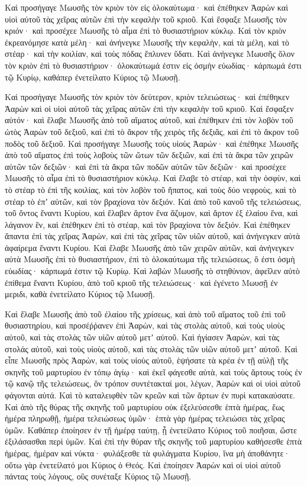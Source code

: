 {Καὶ προσήγαγε Μωυσῆς τὸν κριὸν τὸν εἰς ὁλοκαύτωμα· καὶ ἐπέθηκεν Ἀαρὼν καὶ υἱοὶ αὐτοῦ τὰς χεῖρας αὐτῶν ἐπὶ τὴν κεφαλὴν τοῦ κριοῦ. Καὶ ἔσφαξε Μωυσῆς τὸν κριόν· καὶ προσέχεε Μωυσῆς τὸ αἷμα ἐπὶ τὸ θυσιαστήριον κύκλῳ.
Καὶ τὸν κριὸν ἐκρεανόμησε κατὰ μέλη· καὶ ἀνήνεγκε Μωυσῆς τὴν κεφαλὴν, καὶ τὰ μέλη, καὶ τὸ στέαρ· καὶ τὴν κοιλίαν, καὶ τοὺς πόδας ἔπλυνεν ὕδατι.
Καὶ ἀνήνεγκε Μωυσῆς ὅλον τὸν κριὸν ἐπὶ τὸ θυσιαστήριον· ὁλοκαύτωμά ἐστιν εἰς ὀσμὴν εὐωδίας· κάρπωμά ἐστι τῷ Κυρίῳ, καθάπερ ἐνετείλατο Κύριος τῷ Μωυσῇ.
\par }{\PP {}Καὶ προσήγαγε Μωυσῆς τὸν κριὸν τὸν δεύτερον, κριὸν τελειώσεως· καὶ ἐπέθηκεν Ἀαρὼν καὶ οἱ υἱοὶ αὐτοῦ τὰς χεῖρας αὐτῶν ἐπὶ τὴν κεφαλὴν τοῦ κριοῦ.
Καὶ ἔσφαξεν αὐτόν· καὶ ἔλαβε Μωυσῆς ἀπὸ τοῦ αἵματος αὐτοῦ, καὶ ἐπέθηκεν ἐπὶ τὸν λοβὸν τοῦ ὠτὸς Ἀαρὼν τοῦ δεξιοῦ, καὶ ἐπὶ τὸ ἄκρον τῆς χειρὸς τῆς δεξιᾶς, καὶ ἐπὶ τὸ ἄκρον τοῦ ποδὸς τοῦ δεξιοῦ.
Καὶ προσήγαγε Μωυσῆς τοὺς υἱοὺς Ἀαρών· καὶ ἐπέθηκε Μωυσῆς ἀπὸ τοῦ αἵματος ἐπὶ τοὺς λοβοὺς τῶν ὤτων τῶν δεξιῶν, καὶ ἐπὶ τὰ ἄκρα τῶν χειρῶν αὐτῶν τῶν δεξιῶν· καὶ ἐπὶ τὰ ἄκρα τῶν ποδῶν αὐτῶν τῶν δεξιῶν· καὶ προσέχεε Μωυσῆς τὸ αἷμα ἐπὶ τὸ θυσιαστήριον κύκλῳ.
Καὶ ἔλαβε τὸ στέαρ, καὶ τὴν ὀσφὺν, καὶ τὸ στέαρ τὸ ἐπὶ τῆς κοιλίας, καὶ τὸν λοβὸν τοῦ ἥπατος, καὶ τοὺς δύο νεφροὺς, καὶ τὸ στέαρ τὸ ἐπʼ αὐτῶν, καὶ τὸν βραχίονα τὸν δεξιόν.
Καὶ ἀπὸ τοῦ κανοῦ τῆς τελειώσεως, τοῦ ὄντος ἔναντι Κυρίου, καὶ ἔλαβεν ἄρτον ἕνα ἄζυμον, καὶ ἄρτον ἐξ ἐλαίου ἕνα, καὶ λάγανον ἓν, καὶ ἐπέθηκεν ἐπὶ τὸ στέαρ, καὶ τὸν βραχίονα τὸν δεξιόν.
Καὶ ἐπέθηκεν ἅπαντα ἐπὶ τὰς χεῖρας Ἀαρὼν, καὶ ἐπὶ τὰς χεῖρας τῶν υἱῶν αὐτοῦ, καὶ ἀνήνεγκεν αὐτὰ ἀφαίρεμα ἔναντι Κυρίου.
Καὶ ἔλαβε Μωυσῆς ἀπὸ τῶν χειρῶν αὐτῶν, καὶ ἀνήνεγκεν αὐτὰ Μωυσῆς ἐπὶ τὸ θυσιαστήριον, ἐπὶ τὸ ὁλοκαύτωμα τῆς τελειώσεως, ὅ ἐστι ὀσμὴ εὐωδίας· κάρπωμά ἐστιν τῷ Κυρίῳ.
Καὶ λαβὼν Μωυσῆς τὸ στηθύνιον, ἀφεῖλεν αὐτὸ ἐπίθεμα ἔναντι Κυρίου, ἀπὸ τοῦ κριοῦ τῆς τελειώσεως· καὶ ἐγένετο Μωυσῇ ἐν μεριδι, καθὰ ἐνετείλατο Κύριος τῷ Μωυσῇ.
\par }{\PP {}Καὶ ἔλαβε Μωυσῆς ἀπὸ τοῦ ἐλαίου τῆς χρίσεως, καὶ ἀπὸ τοῦ αἵματος τοῦ ἐπὶ τοῦ θυσιαστηρίου, καὶ προσέῤῥανεν ἐπὶ Ἀαρὼν, καὶ τὰς στολὰς αὐτοῦ, καὶ τοὺς υἱοὺς αὐτοῦ, καὶ τὰς στολὰς τῶν υἱῶν αὐτοῦ μετʼ αὐτοῦ.
Καὶ ἡγίασεν Ἀαρὼν, καὶ τὰς στολάς αὐτοῦ, καὶ τοὺς υἱοὺς αὐτοῦ, καὶ τὰς στολὰς τῶν υἱῶν αὐτοῦ μετʼ αὐτοῦ.
Καὶ εἶπε Μωυσῆς πρὸς Ἀαρὼν, καὶ τοὺς υἱοὺς αὐτοῦ, ἑψήσατε τὰ κρέα ἐν τῇ αὐλῇ τῆς σκηνῆς τοῦ μαρτυρίου ἐν τόπῳ ἁγίῳ· καὶ ἐκεῖ φάγεσθε αὐτὰ, καὶ τοὺς ἄρτους τοὺς ἐν τῷ κανῷ τῆς τελειώσεως, ὃν τρόπον συντέτακταί μοι, λέγων, Ἀαρὼν καὶ οἱ υἱοὶ αὐτοῦ φάγονται αὐτά.
Καὶ τὸ καταλειφθὲν τῶν κρεῶν καὶ τῶν ἄρτων ἐν πυρὶ κατακαύσατε.
Καὶ ἀπὸ τῆς θύρας τῆς σκηνῆς τοῦ μαρτυρίου οὐκ ἐξελεύσεσθε ἑπτὰ ἡμέρας, ἕως ἡμέρα πληρωθῇ, ἡμέρα τελειώσεως ὑμῶν· ἑπτὰ γὰρ ἡμέρας τελειώσει τὰς χεῖρας ὑμῶν.
Καθάπερ ἐποίησεν ἐν τῇ ἡμέρᾳ ταύτῃ, ᾗ ἐνετείλατο Κύριος τοῦ ποιῆσαι, ὥστε ἐξιλάσασθαι περὶ ὑμῶν.
Καὶ ἐπὶ τὴν θύραν τῆς σκηνῆς τοῦ μαρτυρίου καθήσεσθε ἑπτὰ ἡμέρας, ἡμέραν καὶ νύκτα· φυλάξεσθε τὰ φυλάγματα Κυρίου, ἵνα μὴ ἀποθάνητε· οὕτω γὰρ ἐνετείλατό μοι Κύριος ὁ Θεός.
Καὶ ἐποίησεν Ἀαρὼν καὶ οἱ υἱοὶ αὐτοῦ πάντας τοὺς λόγους, οὓς συνέταξε Κύριος τῷ Μωυσῇ.

}
